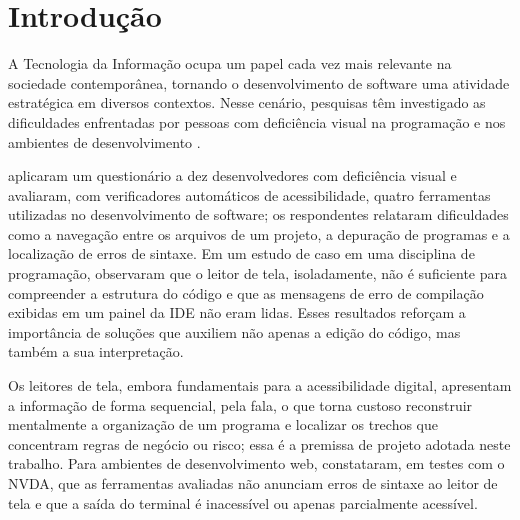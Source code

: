 \documentclass[
    12pt,                   %
    openright,              %
    oneside,                %
    a4paper,                %
    sumario=tradicional,    %
    english,                %
    brazil,                 %
    ]{abntex2}
\begin{document}


\tableofcontents*
\cleardoublepage

\textual

\chapter{Introdução}\label{sec:introducao}

A Tecnologia da Informação ocupa um papel cada vez mais relevante na sociedade contemporânea, tornando o desenvolvimento de software uma atividade estratégica em diversos contextos. Nesse cenário, pesquisas têm investigado as dificuldades enfrentadas por pessoas com deficiência visual na programação e nos ambientes de desenvolvimento \cite{acad54431201,latinoware20457}.

\textcite{latinoware20457} aplicaram um questionário a dez desenvolvedores com deficiência visual e avaliaram, com verificadores automáticos de acessibilidade, quatro ferramentas utilizadas no desenvolvimento de software; os respondentes relataram dificuldades como a navegação entre os arquivos de um projeto, a depuração de programas e a localização de erros de sintaxe. Em um estudo de caso em uma disciplina de programação, \textcite{acad54431201} observaram que o leitor de tela, isoladamente, não é suficiente para compreender a estrutura do código e que as mensagens de erro de compilação exibidas em um painel da IDE não eram lidas. Esses resultados reforçam a importância de soluções que auxiliem não apenas a edição do código, mas também a sua interpretação.

Os leitores de tela, embora fundamentais para a acessibilidade digital, apresentam a informação de forma sequencial, pela fala, o que torna custoso reconstruir mentalmente a organização de um programa e localizar os trechos que concentram regras de negócio ou risco; essa é a premissa de projeto adotada neste trabalho. Para ambientes de desenvolvimento web, \textcite{latinoware6969} constataram, em testes com o NVDA, que as ferramentas avaliadas não anunciam erros de sintaxe ao leitor de tela e que a saída do terminal é inacessível ou apenas parcialmente acessível.
\end{document}
